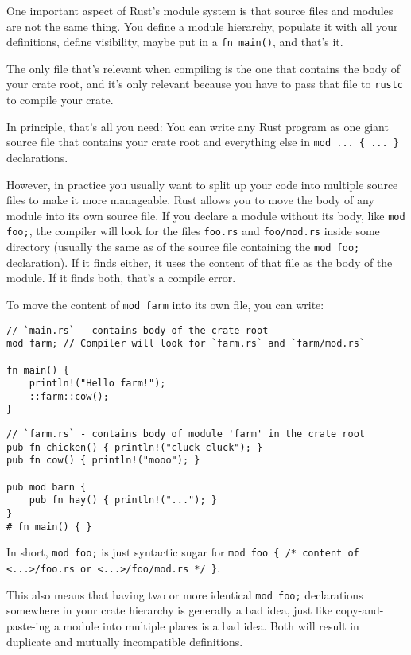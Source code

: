 \documentclass[]{article}
\begin{document}
One important aspect of Rust's module system is that source files and
modules are not the same thing. You define a module hierarchy, populate
it with all your definitions, define visibility, maybe put in a
\texttt{fn main()}, and that's it.

The only file that's relevant when compiling is the one that contains
the body of your crate root, and it's only relevant because you have to
pass that file to \texttt{rustc} to compile your crate.

In principle, that's all you need: You can write any Rust program as one
giant source file that contains your crate root and everything else in
\texttt{mod ... \{ ... \}} declarations.

However, in practice you usually want to split up your code into
multiple source files to make it more manageable. Rust allows you to
move the body of any module into its own source file. If you declare a
module without its body, like \texttt{mod foo;}, the compiler will look
for the files \texttt{foo.rs} and \texttt{foo/mod.rs} inside some
directory (usually the same as of the source file containing the
\texttt{mod foo;} declaration). If it finds either, it uses the content
of that file as the body of the module. If it finds both, that's a
compile error.

To move the content of \texttt{mod farm} into its own file, you can
write:

\begin{verbatim}
// `main.rs` - contains body of the crate root
mod farm; // Compiler will look for `farm.rs` and `farm/mod.rs`

fn main() {
    println!("Hello farm!");
    ::farm::cow();
}
\end{verbatim}

\begin{verbatim}
// `farm.rs` - contains body of module 'farm' in the crate root
pub fn chicken() { println!("cluck cluck"); }
pub fn cow() { println!("mooo"); }

pub mod barn {
    pub fn hay() { println!("..."); }
}
# fn main() { }
\end{verbatim}

In short, \texttt{mod foo;} is just syntactic sugar for
\texttt{mod foo \{ /* content of \textless{}...\textgreater{}/foo.rs or \textless{}...\textgreater{}/foo/mod.rs */ \}}.

This also means that having two or more identical \texttt{mod foo;}
declarations somewhere in your crate hierarchy is generally a bad idea,
just like copy-and-paste-ing a module into multiple places is a bad
idea. Both will result in duplicate and mutually incompatible
definitions.
\end{document}
